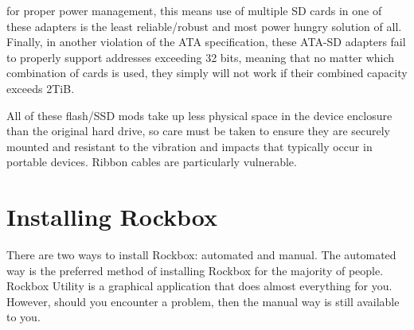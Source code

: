 {\begin{description}
  for proper power management, this means use of multiple SD cards in one of these adapters is the least reliable/robust and most power hungry solution of all.  Finally, in another violation of the ATA specification, these ATA-SD adapters fail
  to properly support addresses exceeding 32 bits, meaning that no matter which combination of cards is used, they simply will
  not work if their combined capacity exceeds 2TiB.
\item
  All of these flash/SSD mods take up less physical space in the device enclosure than the original hard drive, so care
  must be taken to ensure they are securely mounted and resistant to the vibration and impacts that typically occur
  in portable devices.  Ribbon cables are particularly vulnerable.
\end{description}
}

\section{Installing Rockbox}\label{sec:installing_rockbox}
There are two ways to install Rockbox: automated and manual. The automated
way is the preferred method of installing Rockbox for the majority of
people. Rockbox Utility is a graphical application that does almost everything
for you. However, should you encounter a problem, then the manual way is
still available to you.\\



